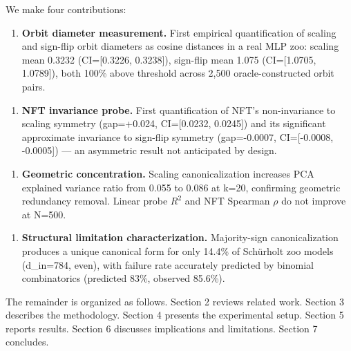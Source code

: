 We make four contributions:

\begin{enumerate}
\item \textbf{Orbit diameter measurement.} First empirical quantification of scaling and sign-flip orbit diameters as cosine distances in a real MLP zoo: scaling mean 0.3232 (CI=[0.3226, 0.3238]), sign-flip mean 1.075 (CI=[1.0705, 1.0789]), both 100\% above threshold across 2,500 oracle-constructed orbit pairs.
\end{enumerate}

\begin{enumerate}
\item \textbf{NFT invariance probe.} First quantification of NFT's non-invariance to scaling symmetry (gap=+0.024, CI=[0.0232, 0.0245]) and its significant approximate invariance to sign-flip symmetry (gap=-0.0007, CI=[-0.0008, -0.0005]) --- an asymmetric result not anticipated by design.
\end{enumerate}

\begin{enumerate}
\item \textbf{Geometric concentration.} Scaling canonicalization increases PCA explained variance ratio from 0.055 to 0.086 at k=20, confirming geometric redundancy removal. Linear probe $R^2$ and NFT Spearman $\rho$ do not improve at N=500.
\end{enumerate}

\begin{enumerate}
\item \textbf{Structural limitation characterization.} Majority-sign canonicalization produces a unique canonical form for only 14.4\% of Schürholt zoo models (d\_in=784, even), with failure rate accurately predicted by binomial combinatorics (predicted 83\%, observed 85.6\%).
\end{enumerate}

The remainder is organized as follows. Section 2 reviews related work. Section 3 describes the methodology. Section 4 presents the experimental setup. Section 5 reports results. Section 6 discusses implications and limitations. Section 7 concludes.

